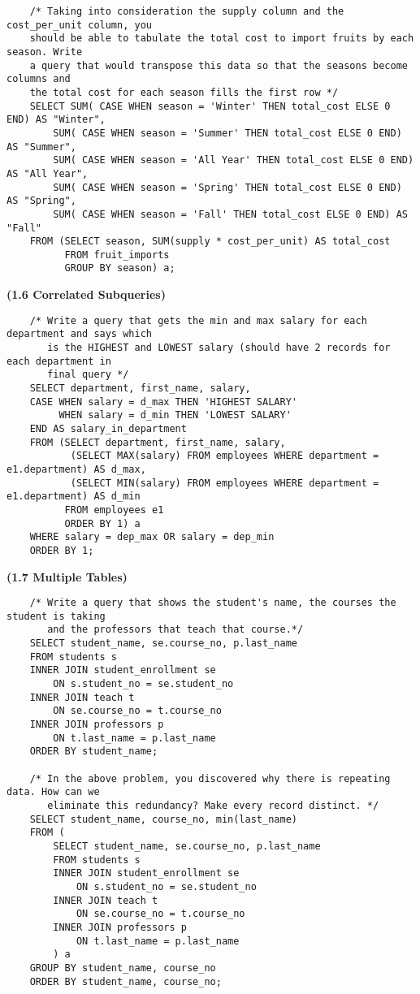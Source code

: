 \documentclass[11pt, a4paper]{article}
\begin{document}
\begin{spacing}{1.1}
\begin{lstlisting}
	/* Taking into consideration the supply column and the cost_per_unit column, you 
	should be able to tabulate the total cost to import fruits by each season. Write 
	a query that would transpose this data so that the seasons become columns and 
	the total cost for each season fills the first row */
	SELECT SUM( CASE WHEN season = 'Winter' THEN total_cost ELSE 0 END) AS "Winter",
		SUM( CASE WHEN season = 'Summer' THEN total_cost ELSE 0 END) AS "Summer",
		SUM( CASE WHEN season = 'All Year' THEN total_cost ELSE 0 END) AS "All Year",
		SUM( CASE WHEN season = 'Spring' THEN total_cost ELSE 0 END) AS "Spring",
		SUM( CASE WHEN season = 'Fall' THEN total_cost ELSE 0 END) AS "Fall"
	FROM (SELECT season, SUM(supply * cost_per_unit) AS total_cost
		  FROM fruit_imports
		  GROUP BY season) a; \end{lstlisting} \newpage
	\noindent \large \textbf{(1.6 Correlated Subqueries)} \normalsize
	\begin{lstlisting}
	/* Write a query that gets the min and max salary for each department and says which 
	   is the HIGHEST and LOWEST salary (should have 2 records for each department in 
	   final query */	
	SELECT department, first_name, salary, 
	CASE WHEN salary = d_max THEN 'HIGHEST SALARY'
	     WHEN salary = d_min THEN 'LOWEST SALARY'
	END AS salary_in_department
	FROM (SELECT department, first_name, salary, 
	       (SELECT MAX(salary) FROM employees WHERE department = e1.department) AS d_max, 
	       (SELECT MIN(salary) FROM employees WHERE department = e1.department) AS d_min
	      FROM employees e1
	      ORDER BY 1) a
	WHERE salary = dep_max OR salary = dep_min
	ORDER BY 1;	\end{lstlisting} \vspace*{6mm}
	\noindent \large \textbf{(1.7 Multiple Tables)} \normalsize
	\begin{lstlisting}
	/* Write a query that shows the student's name, the courses the student is taking 
	   and the professors that teach that course.*/
	SELECT student_name, se.course_no, p.last_name 
	FROM students s 
	INNER JOIN student_enrollment se 
		ON s.student_no = se.student_no
	INNER JOIN teach t 
		ON se.course_no = t.course_no
	INNER JOIN professors p 
		ON t.last_name = p.last_name
	ORDER BY student_name;
		
	/* In the above problem, you discovered why there is repeating data. How can we 
	   eliminate this redundancy? Make every record distinct. */
	SELECT student_name, course_no, min(last_name)
	FROM (
		SELECT student_name, se.course_no, p.last_name 
		FROM students s 
		INNER JOIN student_enrollment se 
			ON s.student_no = se.student_no
		INNER JOIN teach t 
			ON se.course_no = t.course_no
		INNER JOIN professors p 
			ON t.last_name = p.last_name
		) a
	GROUP BY student_name, course_no
	ORDER BY student_name, course_no;
	

\end{lstlisting}
\end{spacing}
\end{document}

